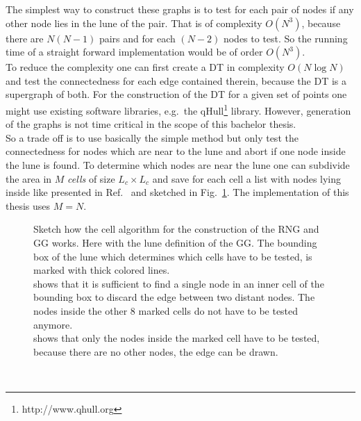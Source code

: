     The simplest way to construct these graphs is to test for each
    pair of nodes if any other node lies in
    the lune of the pair. That is of complexity \(O (N^3)\), because
    there are \(N(N-1)\) pairs and for each \((N-2)\) nodes to test. So
    the running time of a straight forward implementation would be of
    order \(O(N^3)\).\\
    To reduce the complexity one can first create a DT in complexity \(O (N \log N)\)
    \cite{RNGCell} and test the connectedness for each edge contained
    therein, because the DT is a supergraph of both.
    For the construction of the DT for a given set of points one might
    use existing software libraries, e.g.\ the qHull\footnote{http://www.qhull.org} library.
    However, generation of the graphs is not time critical in the scope
    of this bachelor thesis.\\
    So a trade off is to use basically the simple method but only test
    the connectedness for nodes which are near to the lune and abort if
    one node inside the lune is found. To determine which nodes are
    near the lune one can subdivide the area in \(M\) \emph{cells} of size
    \(L_c \times L_c\) and save for each cell a list with nodes lying
    inside like presented in Ref.\ \cite{RNGCell} and sketched in Fig.\ \ref{fig:cell}.
    The implementation of this thesis uses \(M=N\).
    \begin{figure}[htbp]
        \centering
        \caption[Sketch how the Cell Method works]
        {
            Sketch how the cell algorithm for the construction of the
            RNG and GG works. Here with the lune definition of the GG.
            The bounding box of the lune which determines which cells have
            to be tested, is marked with thick colored lines.\\
             shows that it is sufficient to find a
            single node in an inner cell of the bounding box to discard
            the edge between two distant nodes. The nodes inside the
            other 8 marked cells do not have to be tested anymore.\\
             shows that only the nodes inside the
            marked cell have to be tested, because there are no other nodes,
            the edge can be drawn.
        }
        \label{fig:cell}
    \end{figure}\\
